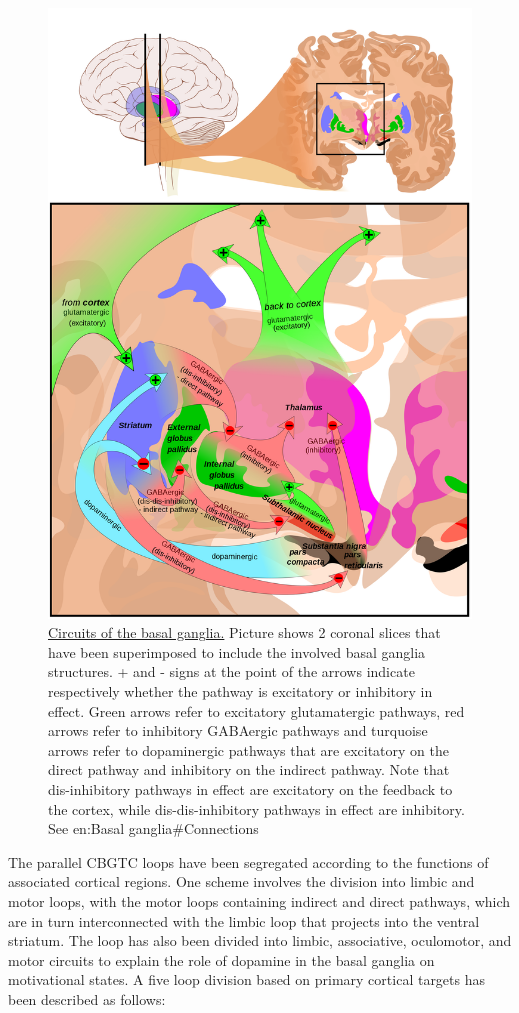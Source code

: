 \begin{figure}

{\centering \includegraphics[width=0.7\linewidth]{./figures/motor/Basal_ganglia_circuits} 

}

\caption{\href{https://commons.wikimedia.org/wiki/File:Basal_ganglia_circuits.svg}{Circuits of the basal ganglia.} Picture shows 2 coronal slices that have been superimposed to include the involved basal ganglia structures. + and - signs at the point of the arrows indicate respectively whether the pathway is excitatory or inhibitory in effect. Green arrows refer to excitatory glutamatergic pathways, red arrows refer to inhibitory GABAergic pathways and turquoise arrows refer to dopaminergic pathways that are excitatory on the direct pathway and inhibitory on the indirect pathway. Note that dis-inhibitory pathways in effect are excitatory on the feedback to the cortex, while dis-dis-inhibitory pathways in effect are inhibitory. See en:Basal ganglia\#Connections}\label{fig:basalcircuits}
\end{figure}

The parallel CBGTC loops have been segregated according to the functions of associated cortical regions. One scheme involves the division into limbic and motor loops, with the motor loops containing indirect and direct pathways, which are in turn interconnected with the limbic loop that projects into the ventral striatum. The loop has also been divided into limbic, associative, oculomotor, and motor circuits to explain the role of dopamine in the basal ganglia on motivational states. A five loop division based on primary cortical targets has been described as follows:

